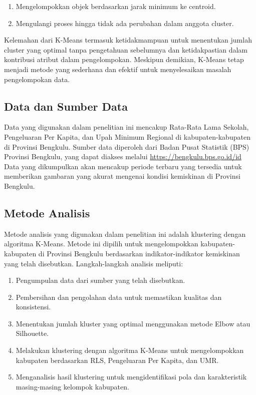 \documentclass[12pt,a4paper]{article}
\begin{document}
\begin{multicols}{2}
\begin{enumerate}
    \item Mengelompokkan objek berdasarkan jarak minimum ke centroid.

    \item Mengulangi proses hingga tidak ada perubahan dalam anggota cluster.

\end{enumerate}
   
Kelemahan dari K-Means termasuk ketidakmampuan untuk menentukan jumlah cluster yang optimal tanpa pengetahuan sebelumnya dan ketidakpastian dalam kontribusi atribut dalam pengelompokan. Meskipun demikian, K-Means tetap menjadi metode yang sederhana dan efektif untuk menyelesaikan masalah pengelompokan data.



\subsection{Data dan Sumber Data}

Data yang digunakan dalam penelitian ini mencakup Rata-Rata Lama Sekolah, Pengeluaran Per Kapita, dan Upah Minimum Regional di kabupaten-kabupaten di Provinsi Bengkulu. Sumber data diperoleh dari Badan Pusat Statistik (BPS) Provinsi Bengkulu, yang dapat diakses melalui \url{https://bengkulu.bps.go.id/id} Data yang dikumpulkan akan mencakup periode terbaru yang tersedia untuk memberikan gambaran yang akurat mengenai kondisi kemiskinan di Provinsi Bengkulu.

\subsection{Metode Analisis}

Metode analisis yang digunakan dalam penelitian ini adalah klustering dengan algoritma K-Means. Metode ini dipilih untuk mengelompokkan kabupaten-kabupaten di Provinsi Bengkulu berdasarkan indikator-indikator kemiskinan yang telah disebutkan. Langkah-langkah analisis meliputi:

\begin{enumerate}
    \item Pengumpulan data dari sumber yang telah disebutkan.
    \item Pembersihan dan pengolahan data untuk memastikan kualitas dan konsistensi.
    \item Menentukan jumlah kluster yang optimal menggunakan metode Elbow atau Silhouette.
    \item Melakukan klustering dengan algoritma K-Means untuk mengelompokkan kabupaten berdasarkan RLS, Pengeluaran Per Kapita, dan UMR.
    \item Menganalisis hasil klustering untuk mengidentifikasi pola dan karakteristik masing-masing kelompok kabupaten.
\end{enumerate}


\end{multicols}
\end{document}
